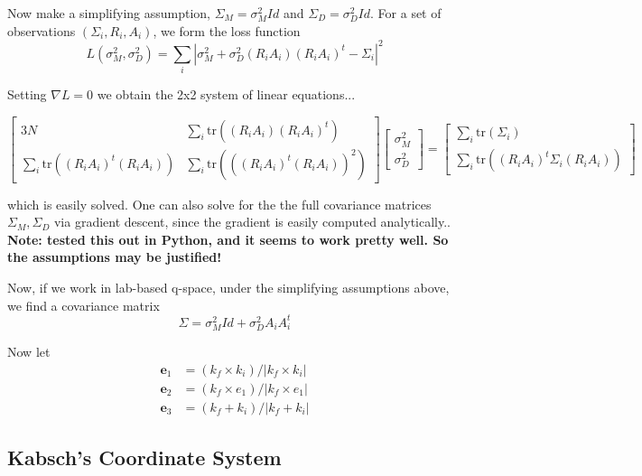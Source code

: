 \documentclass[11pt,a4paper]{article}
\newcommand{\be}{\mathbf{e}}
\newcommand{\tr}{\mathrm{tr}}
\begin{document}
Now make a simplifying assumption, $\Sigma_M = \sigma_M^2 Id$ and $\Sigma_D = \sigma_D^2 Id$. For a set of observations $(\Sigma_i, R_i, A_i)$, we form the loss function
\begin{equation} L(\sigma_M^2, \sigma_D^2) = \sum_i |\sigma_M^2 + \sigma_D^2 (R_i A_i)(R_iA_i)^t - \Sigma_i|^2 \end{equation}

Setting $\nabla L = 0$ we obtain the 2x2 system of linear equations...

\begin{equation} \begin{bmatrix}
  3N & \sum_i \tr( (R_iA_i)(R_i A_i)^t) \\
  \sum_i \tr((R_iA_i)^t(R_i A_i)) & \sum_i \tr(((R_i A_i)^t(R_iA_i))^2)
\end{bmatrix}
\begin{bmatrix} \sigma_M^2 \\ \sigma_D^2 \end{bmatrix}
=  \begin{bmatrix} \sum_i \tr(\Sigma_i) \\ \sum_i \tr((R_i A_i)^t \Sigma_i (R_i A_i)) \end{bmatrix}  \end{equation}

which is easily solved. One can also solve for the the full covariance matrices $\Sigma_M, \Sigma_D$ via gradient descent, since the gradient is easily computed analytically.. \textbf{Note: tested this out in Python, and it seems to work pretty well. So the assumptions may be justified!}

Now, if we work in lab-based q-space, under the simplifying assumptions above, we find a covariance matrix
\begin{equation} \Sigma = \sigma_M^2 Id + \sigma_D^2 A_i A_i^t \end{equation}

Now let
\begin{align}
  \be_1 &= (k_f \times k_i) / |k_f \times k_i| \\
  \be_2 &= (k_f \times e_1) / |k_f \times e_1| \\
  \be_3 &= (k_f + k_i) / |k_f + k_i|
\end{align}


\subsection{Kabsch's Coordinate System}
\end{document}

